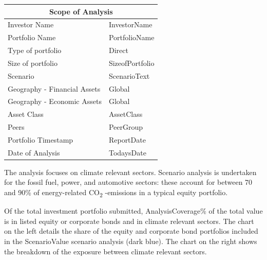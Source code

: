 \documentclass[10pt,table]{article}\usepackage[]{graphicx}\usepackage[]{color}
\begin{document}
\begin{multicols}{2}
		\begin{center}
			{
				\setlength{\tabcolsep}{10pt} %
				\renewcommand{\arraystretch}{1.5} %
				\begin{tabular}{ p{.35\linewidth} p{.49\linewidth} }
					\hline
					\multicolumn{2}{c}{\textbf{Scope of Analysis}} \\
					\hline
					Investor Name & InvestorName \\ 
					Portfolio Name & PortfolioName \\ 
					Type of portfolio & Direct \\
					Size of portfolio & SizeofPortfolio \\ 
					Scenario & ScenarioText \\ 
					Geography - \newline Financial Assets & Global \\ 
					Geography - \newline Economic Assets & Global \\ 
					Asset Class & AssetClass \\ 
					Peers & PeerGroup \\
					Portfolio Timestamp & ReportDate \\ 
					Date of Analysis & TodaysDate \\ 
					\hline
				\end{tabular}
			}

		\end{center}

		The analysis focuses on climate relevant sectors. Scenario analysis is undertaken for the fossil fuel, power, and automotive sectors: these account for between 70 and 90\% of energy-related CO\textsubscript{2} -emissions in a typical equity portfolio. 

		Of the total investment portfolio submitted, AnalysisCoverage\% of the total value is in listed equity or corporate bonds and in climate relevant sectors. The chart on the left details the share of the equity and corporate bond portfolios included in the ScenarioValue scenario analysis (dark blue). The chart on the right shows the breakdown of the exposure between climate relevant sectors.




		\vspace{1.2cm}


	\end{multicols}	
\end{document}
